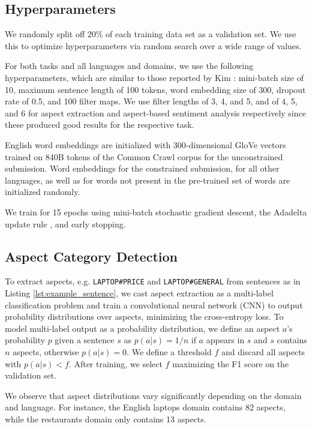 \documentclass[11pt,letterpaper]{article}
\begin{document}
\subsection{Hyperparameters}

We randomly split off 20\% of each training data set as a validation set. We use this to optimize hyperparameters via random search over a wide range of values.

For both tasks and all languages and domains, we use the following hyperparameters, which are similar to those reported by Kim : mini-batch size of 10, maximum sentence length of 100 tokens, word embedding size of 300, dropout rate of 0.5, and 100 filter maps. We use filter lengths of 3, 4, and 5, and of 4, 5, and 6 for aspect extraction and aspect-based sentiment analysis respectively since these produced good results for the respective task.

English word embeddings are initialized with 300-dimensional GloVe vectors \cite{Pennington2014} trained on 840B tokens of the Common Crawl corpus for the unconstrained submission. Word embeddings for the constrained submission, for all other languages, as well as for words not present in the pre-trained set of words are initialized randomly. 

We train for 15 epochs using mini-batch stochastic gradient descent, the Adadelta update rule \cite{Zeiler2012}, and early stopping.

\subsection{Aspect Category Detection}

To extract aspects, e.g. \texttt{LAPTOP\#PRICE} and \texttt{LAPTOP\#GENERAL} from sentences as in Listing \ref{lst:example_sentence}, we cast aspect extraction as a multi-label classification problem and train a convolutional neural network (CNN) to output probability distributions over aspects, minimizing the cross-entropy loss. To model multi-label output as a probability distribution, we define an aspect $a$'s probability $p$ given a sentence $s$ as $p(a | s) = 1 / n$ if $a$ appears in $s$ and $s$ contains $n$ aspects, otherwise $p(a | s) = 0$. We define a threshold $f$ and discard all aspects with $p(a | s) < f$. After training, we select $f$ maximizing the F1 score on the validation set.

We observe that aspect distributions vary significantly depending on the domain and language. For instance, the English laptops domain contains 82 aspects, while the restaurants domain only contains 13 aspects.
\end{document}

